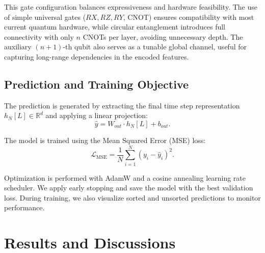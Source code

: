 \documentclass[conference]{IEEEtran}
\begin{document}
This gate configuration balances expressiveness and hardware feasibility. The use of simple universal gates ($RX, RZ, RY$, CNOT) ensures compatibility with most current quantum hardware, while circular entanglement introduces full connectivity with only $n$ CNOTs per layer, avoiding unnecessary depth. The auxiliary $(n+1)$-th qubit also serves as a tunable global channel, useful for capturing long-range dependencies in the encoded features.


\subsection{Prediction and Training Objective}

The prediction is generated by extracting the final time step representation $h_N[L] \in \mathbb{R}^d$ and applying a linear projection:
\begin{equation}
\hat{y} = W_{out} \cdot h_N[L] + b_{out}.
\end{equation}

The model is trained using the Mean Squared Error (MSE) loss:
\begin{equation}
\mathcal{L}_{\text{MSE}} = \frac{1}{N} \sum_{i=1}^N (y_i - \hat{y}_i)^2.
\end{equation}

Optimization is performed with AdamW and a cosine annealing learning rate scheduler. We apply early stopping and save the model with the best validation loss. During training, we also visualize sorted and unsorted predictions to monitor performance.






\section{Results and Discussions}
\end{document}
